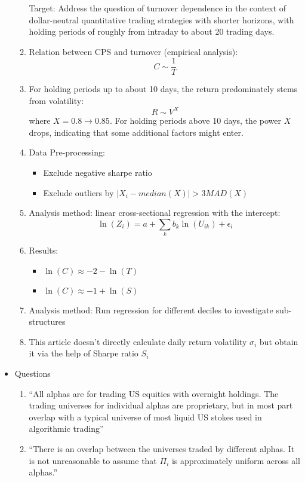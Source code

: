 \documentclass[fontsize=11pt, %
                             paper=a4, %
                             twoside, %
                             captions=tableheading,
                             index=totoc,
                             hyperref]{labbook}
\begin{document}
\begin{addmargin}[4cm]{0cm}
\begin{itemize}
\begin{enumerate}
Target: Address the question of turnover dependence in the context of dollar-neutral quantitative trading strategies with shorter horizons, with holding periods of roughly from intraday to about 20 trading days.
\item
Relation between CPS and turnover (empirical analysis):
\begin{equation}
C\sim\frac{1}{T}
\end{equation}
\item
For holding periods up to about 10 days, the return predominately stems from volatility:
\begin{equation}
R\sim V^X
\end{equation}
where $X=0.8\to0.85$. For holding periods above 10 days, the power $X$ drops, indicating that some additional factors might enter.
\item Data Pre-processing:
\begin{itemize}
\item
Exclude negative sharpe ratio
\item
Exclude outliers by $|X_i - median(X)|>3 MAD(X)$
\end{itemize} 
\item Analysis method: linear cross-sectional regression with the intercept:
\begin{equation}
\ln(Z_i)=a+\sum_k b_k \ln(U_{ik})+\epsilon_i
\end{equation}
\item Results:
\begin{itemize}
\item
$\ln(C)\approx -2 -\ln(T)$
\item
$\ln(C)\approx-1+\ln(S)$
\end{itemize}
\item Analysis method: Run regression for different deciles to investigate sub-structures
\item This article doesn't directly calculate daily return volatility $\sigma_i$ but obtain it via the help of Sharpe ratio $S_i$
\end{enumerate}
\item Questions
\begin{enumerate}
\item
``All alphas are for trading US equities with overnight holdings. The trading universes for individual alphas are proprietary, but in most part overlap with a typical universe of most liquid US stokes used in algorithmic trading''
\item
``There is an overlap between the universes traded by different alphas. It is not unreasonable to assume that $\Pi_i$ is approximately uniform across all alphas.''

\end{enumerate}
\end{itemize}
\end{addmargin}
\end{document}
